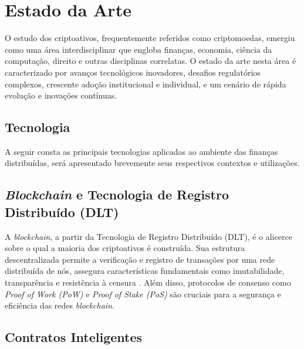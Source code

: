 \chapter{Estado da Arte}
O estudo dos criptoativos, frequentemente referidos como criptomoedas, emergiu como uma área interdisciplinar que engloba finanças, economia, ciência da computação, direito e outras disciplinas correlatas. O estado da arte nesta área é caracterizado por avanços tecnológicos inovadores, desafios regulatórios complexos, crescente adoção institucional e individual, e um cenário de rápida evolução e inovações contínuas.


\section{Tecnologia}
A seguir consta as principais tecnologias aplicadas ao ambiente das finanças distribuídas, será apresentado brevemente seus respectivos contextos e utilizações.

\section*{\textit{Blockchain} e Tecnologia de Registro Distribuído (DLT)}

A \textit{blockchain}, a partir da Tecnologia de Registro Distribuído (DLT), é o alicerce sobre o qual a maioria dos criptoativos é construída. Sua estrutura descentralizada  permite a verificação e registro de transações por uma rede distribuída de nós, assegura características fundamentais como imutabilidade, transparência e resistência à censura \cite{Nakamoto2009}. Além disso, protocolos de consenso como \textit{Proof of Work (PoW)} e \textit{Proof of Stake (PoS)} são cruciais para a segurança e eficiência das redes \textit{blockchain}.

\section*{Contratos Inteligentes}

